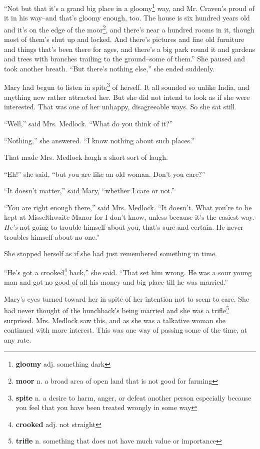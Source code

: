 ``Not but that it's a grand big place in a gloomy\footnote{\textbf{gloomy} adj. something dark} way, and Mr. Craven's proud of it in his way--and that's gloomy enough, too. The house is six hundred years old and it's on the edge of the moor\footnote{\textbf{moor} n. a broad area of open land that is not good for farming}, and there's near a hundred rooms in it, though most of them's shut up and locked. And there's pictures and fine old furniture and things that's been there for ages, and there's a big park round it and gardens and trees with branches trailing to the ground--some of them.'' She paused and took another breath. ``But there's nothing else,'' she ended suddenly.

Mary had begun to listen in spite\footnote{\textbf{spite} n. a desire to harm, anger, or defeat another person especially because you feel that you have been treated wrongly in some way} of herself. It all sounded so unlike India, and anything new rather attracted her. But she did not intend to look as if she were interested. That was one of her unhappy, disagreeable ways. So she sat still.

``Well,'' said Mrs. Medlock. ``What do you think of it?''

``Nothing,'' she answered. ``I know nothing about such places.''

That made Mrs. Medlock laugh a short sort of laugh.

``Eh!'' she said, ``but you are like an old woman. Don't you care?''

``It doesn't matter,'' said Mary, ``whether I care or not.''

``You are right enough there,'' said Mrs. Medlock. ``It doesn't. What you're to be kept at Misselthwaite Manor for I don't know, unless because it's the easiest way. \textit{He's} not going to trouble himself about you, that's sure and certain. He never troubles himself about no one.''

She stopped herself as if she had just remembered something in time.

``He's got a crooked\footnote{\textbf{crooked} adj. not straight} back,'' she said. ``That set him wrong. He was a sour young man and got no good of all his money and big place till he was married.''

Mary's eyes turned toward her in spite of her intention not to seem to care. She had never thought of the hunchback's being married and she was a trifle\footnote{\textbf{trifle} n. something that does not have much value or importance} surprised. Mrs. Medlock saw this, and as she was a talkative woman she continued with more interest. This was one way of passing some of the time, at any rate.

